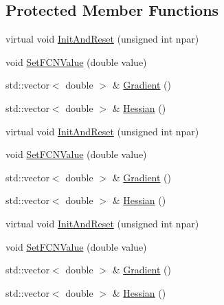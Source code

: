 \subsection*{Protected Member Functions}
\begin{DoxyCompactItemize}
\item 
virtual void \mbox{\hyperlink{classROOT_1_1Minuit2_1_1FumiliFCNBase_a523d4811858adf42922499fa6c2bcdba}{Init\+And\+Reset}} (unsigned int npar)
\item 
void \mbox{\hyperlink{classROOT_1_1Minuit2_1_1FumiliFCNBase_a537ad24d5584bd089c14ee92567ddd72}{Set\+F\+C\+N\+Value}} (double value)
\item 
std\+::vector$<$ double $>$ \& \mbox{\hyperlink{classROOT_1_1Minuit2_1_1FumiliFCNBase_a61cd6d04313bf324c6a226e16017ad4f}{Gradient}} ()
\item 
std\+::vector$<$ double $>$ \& \mbox{\hyperlink{classROOT_1_1Minuit2_1_1FumiliFCNBase_ac90c52050c1f7557834e3fa82c2657f3}{Hessian}} ()
\item 
virtual void \mbox{\hyperlink{classROOT_1_1Minuit2_1_1FumiliFCNBase_a523d4811858adf42922499fa6c2bcdba}{Init\+And\+Reset}} (unsigned int npar)
\item 
void \mbox{\hyperlink{classROOT_1_1Minuit2_1_1FumiliFCNBase_a537ad24d5584bd089c14ee92567ddd72}{Set\+F\+C\+N\+Value}} (double value)
\item 
std\+::vector$<$ double $>$ \& \mbox{\hyperlink{classROOT_1_1Minuit2_1_1FumiliFCNBase_a61cd6d04313bf324c6a226e16017ad4f}{Gradient}} ()
\item 
std\+::vector$<$ double $>$ \& \mbox{\hyperlink{classROOT_1_1Minuit2_1_1FumiliFCNBase_ac90c52050c1f7557834e3fa82c2657f3}{Hessian}} ()
\item 
virtual void \mbox{\hyperlink{classROOT_1_1Minuit2_1_1FumiliFCNBase_a523d4811858adf42922499fa6c2bcdba}{Init\+And\+Reset}} (unsigned int npar)
\item 
void \mbox{\hyperlink{classROOT_1_1Minuit2_1_1FumiliFCNBase_a537ad24d5584bd089c14ee92567ddd72}{Set\+F\+C\+N\+Value}} (double value)
\item 
std\+::vector$<$ double $>$ \& \mbox{\hyperlink{classROOT_1_1Minuit2_1_1FumiliFCNBase_a61cd6d04313bf324c6a226e16017ad4f}{Gradient}} ()
\item 
std\+::vector$<$ double $>$ \& \mbox{\hyperlink{classROOT_1_1Minuit2_1_1FumiliFCNBase_ac90c52050c1f7557834e3fa82c2657f3}{Hessian}} ()
\end{DoxyCompactItemize}


